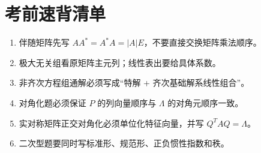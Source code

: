 \documentclass[11pt,a4paper,UTF8]{ctexart}
\begin{document}
\section{考前速背清单}

\begin{scorebox}[最后一遍]
\begin{enumerate}
\item 伴随矩阵先写 $AA^*=A^*A=|A|E$，不要直接交换矩阵乘法顺序。
\item 极大无关组看原矩阵主元列；线性表出要给具体系数。
\item 非齐次方程组通解必须写成“特解 + 齐次基础解系线性组合”。
\item 对角化题必须保证 $P$ 的列向量顺序与 $\Lambda$ 的对角元顺序一致。
\item 实对称矩阵正交对角化必须单位化特征向量，并写 $Q^TAQ=\Lambda$。
\item 二次型题要同时写标准形、规范形、正负惯性指数和秩。
\end{enumerate}
\end{scorebox}
\end{document}

